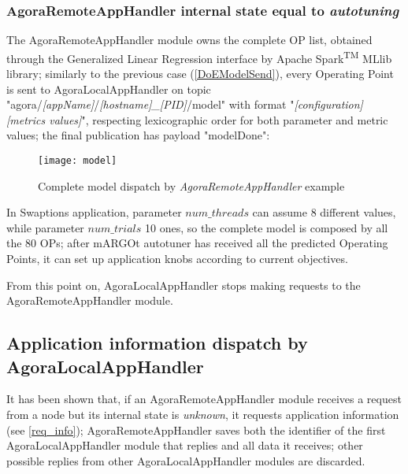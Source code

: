 \subsubsection{AgoraRemoteAppHandler internal state equal to \textit{autotuning}}\label{modelSend}

The AgoraRemoteAppHandler module owns the complete OP list, obtained through the Generalized Linear Regression interface by A\-pach\-e Spark\textsuperscript{TM} MLlib library; similarly to the previous case (\ref{DoEModelSend}), every Operating Point is sent to AgoraLocalAppHandler on topic "agora\slash{}\textit{[app\-Name]}\slash{}\textit{[host\-name]\_[PID]}\slash{}model" with format "\textit{[configuration] [metrics values]}", respecting lexicographic order for both parameter and metric values; the final publication has payload "modelDone":

\begin{figure}[H]

    \centering
    \texttt{[image: model]}
    \caption{Complete model dispatch by \textit{AgoraRemoteAppHandler} example}
    \label{fig:model}
    
\end{figure}

In Swaptions application, parameter $num\_threads$ can assume 8 different values, while parameter $num\_trials$ 10 ones, so the complete model is composed by all the 80 OPs; after mARGOt autotuner has received all the predicted Operating Points, it can set up application knobs according to current objectives.

From this point on, AgoraLocalAppHandler stops making requests to the AgoraRemoteAppHandler module.





\subsection{Application information dispatch by AgoraLocalAppHandler}\label{client_info}

It has been shown that, if an AgoraRemoteAppHandler module receives a request from a node but its internal state is \textit{unknown}, it requests application information (see \ref{req_info}); AgoraRemoteAppHandler saves both the identifier of the first AgoraLocalAppHandler module that replies and all data it receives; other possible replies from other AgoraLocalAppHandler modules are discarded.

